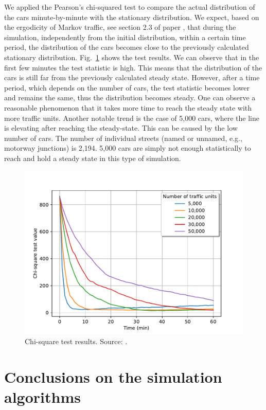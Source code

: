 \documentclass[b5paper,12pt]{report}
\theoremstyle{definition}
\begin{document}
We applied the Pearson's chi-squared test to compare the actual distribution of the cars minute-by-minute with the stationary distribution. We expect, based on the ergodicity of Markov traffic, see section 2.3 of paper \cite{traffic-paper}, that during the simulation, independently from the initial distribution, within a certain time period, the distribution of the cars becomes close to the previously calculated stationary distribution. Fig.~\ref{DIST_chi_sq} shows the test results. We can observe that in the first few minutes the test statistic is high. This means that the distribution of the cars is still far from the previously calculated steady state. However, after a time period, which depends on the number of cars, the test statistic becomes lower and remains the same, thus the distribution becomes steady. One can observe a reasonable phenomenon that it takes more time to reach the steady state with more traffic units. Another notable trend is the case of 5,000 cars, where the line is elevating after reaching the steady-state. This can be caused by the low number of cars. The number of individual streets (named or unnamed, e.g., motorway junctions) is 2,194. 5,000 cars are simply not enough statistically to reach and hold a steady state in this type of simulation.

\begin{figure}[!t]
    \centering
    \includegraphics[width=.8\textwidth]{img/DIST.pdf}
    \caption{Chi-square test results. Source: \cite{traffic-paper}.}
    \label{DIST_chi_sq}
\end{figure}

\section{Conclusions on the simulation algorithms}
\end{document}
